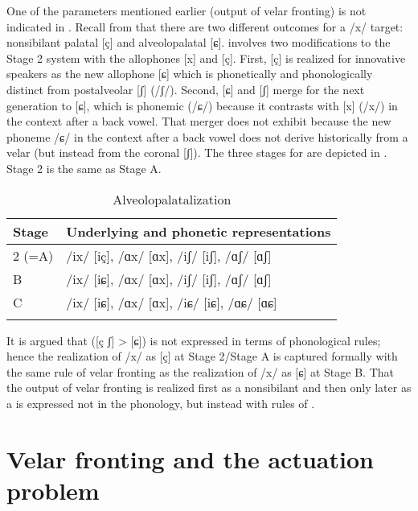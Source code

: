 One of the parameters mentioned earlier (output of velar fronting) is not indicated in . Recall from  that there are two different outcomes for a /x/ target: nonsibilant palatal [ç] and  alveolopalatal [ɕ].  involves two modifications to the Stage 2 system with the allophones [x] and [ç]. First, [ç] is realized for innovative speakers as the new allophone [ɕ] which is phonetically and phonologically distinct from postalveolar [ʃ] (/ʃ/). Second, [ɕ] and [ʃ] merge for the next generation to [ɕ], which is phonemic (/ɕ/) because it contrasts with [x] (/x/) in the context after a back vowel. That merger does not exhibit  because the new phoneme /ɕ/ in the context after a back vowel does not derive historically from a velar (but instead from the coronal [ʃ]). The three stages for  are depicted in . Stage 2 is the same as Stage A.

\begin{table}
\caption{Alveolopalatalization\label{tab:16:6}}
\begin{tabular}{ll}
\lsptoprule
Stage & Underlying and phonetic representations \\\midrule
2 (=A) & /ix/ [iç], /ɑx/ [ɑx], /iʃ/ [iʃ], /ɑʃ/ [ɑʃ]  \\
B & /ix/ [iɕ], /ɑx/ [ɑx], /iʃ/ [iʃ], /ɑʃ/ [ɑʃ] \\
C & /ix/ [iɕ], /ɑx/ [ɑx], /iɕ/ [iɕ], /ɑɕ/ [ɑɕ] \\
\lspbottomrule
\end{tabular}
\end{table}

It is argued that  ([ç ʃ] > [ɕ]) is not expressed in terms of phonological rules; hence the realization of /x/ as [ç] at Stage 2/Stage A is captured formally with the same rule of velar fronting as the realization of /x/ as [ɕ] at Stage B. That the output of velar fronting is realized first as a nonsibilant and then only later as a  is expressed not in the phonology, but instead with rules of .

\section{{Velar} {fronting} {and} {the} {actuation} {problem}}\label{sec:16.7}

